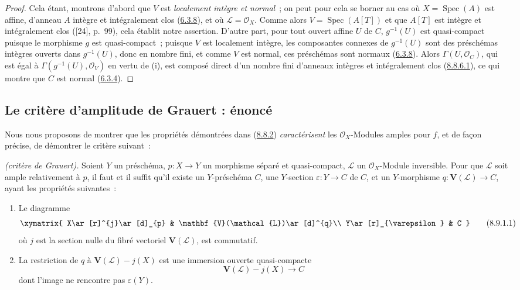 \begin{proof}
Cela étant, montrons d'abord que $V$ est \emph{localement intègre et normal}~;
on peut pour cela se borner au cas où $X=\operatorname{Spec}(A)$ est affine,
d'anneau $A$ intègre et intégralement clos
(\hyperref[II.6.3.8-fr]{6.3.8}), et où
$\mathcal{L}=\mathcal{O}_X$. Comme alors
$V=\operatorname{Spec}(A[T])$ et que $A[T]$ est intègre et intégralement clos
([24], p.~99), cela établit notre assertion. D'autre part, pour tout ouvert
affine $U$ de $C$, $g^{-1}(U)$ est quasi-compact puisque le morphisme $g$ est
quasi-compact~; puisque $V$ est localement intègre, les composantes connexes
de $g^{-1}(U)$ sont des préschémas intègres ouverts dans $g^{-1}(U)$, donc en
nombre fini, et comme $V$ est normal, ces préschémas sont normaux
(\hyperref[II.6.3.8-fr]{6.3.8}). Alors $\Gamma(U,\mathcal{O}_C)$, qui est égal
à $\Gamma(g^{-1}(U),\mathcal{O}_V)$ en vertu de (i), est composé direct d'un
nombre fini d'anneaux intègres et intégralement clos
(\hyperref[II.8.8.6.1-fr]{8.8.6.1}), ce qui montre que $C$ est normal
(\hyperref[II.6.3.4-fr]{6.3.4}).
\end{proof}

\subsection{Le critère d'amplitude de Grauert : énoncé}
\label{subsection:II.8.9-fr}

Nous nous proposons de montrer que les propriétés démontrées dans
(\hyperref[II.8.8.2-fr]{8.8.2}) \emph{caractérisent} les
$\mathcal{O}_X$-Modules amples pour $f$, et de façon précise, de démontrer le
critère suivant~:

\begin{theorem}[8.9.1]
\label{II.8.9.1-fr}
\emph{(critère de Grauert).} Soient $Y$ un préschéma,
$p:X\to Y$ un morphisme séparé et quasi-compact, $\mathcal{L}$ un
$\mathcal{O}_X$-Module inversible. Pour que $\mathcal{L}$ soit ample
relativement à $p$, il faut et il suffit qu'il existe un $Y$-préschéma $C$,
une $Y$-section $\varepsilon:Y\to C$ de $C$, et un $Y$-morphisme
$q:\mathbf{V}(\mathcal{L})\to C$, ayant les propriétés suivantes~:
\begin{enumerate}
  \item[\rm{(i)}] Le diagramme
  \begin{equation}
  \label{II.8.9.1.1-fr}
    \xymatrix{
      X\ar[r]^{j}\ar[d]_{p} & \mathbf{V}(\mathcal{L})\ar[d]^{q}\\
      Y\ar[r]_{\varepsilon} & C
    }
  \tag{8.9.1.1}
  \end{equation}
  où $j$ est la section nulle du fibré vectoriel $\mathbf{V}(\mathcal{L})$,
  est commutatif.
  \item[\rm{(ii)}] La restriction de $q$ à
  $\mathbf{V}(\mathcal{L})-j(X)$ est une immersion ouverte quasi-compacte
  \[
    \mathbf{V}(\mathcal{L})-j(X)\longrightarrow C
  \]
  dont l'image ne rencontre pas $\varepsilon(Y)$.
\end{enumerate}
\end{theorem}

